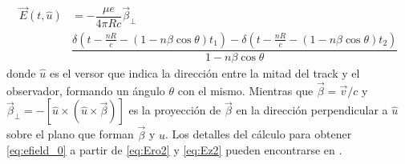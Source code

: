 	\begin{equation}
	\renewcommand{\arraystretch}{2.5}
	\begin{array}{rl}
		\vec{E}(t,\hat{u})
		&=
		-\dfrac{\mu e}{4\pi Rc}
		\vec\beta_{\bot}\\
		& 
		\dfrac{\delta(t-\frac{nR}{c}-(1-n\beta\cos\theta)t_1)
			-\delta(t-\frac{nR}{c}-(1-n\beta\cos\theta)t_2)}{1-n\beta\cos\theta}
	\end{array}
	\label{eq:efield_0}
	\end{equation}
	donde $\hat{u}$ es el versor que indica la direcci\'on entre la mitad del track y el observador, formando un \'angulo $\theta$ con el mismo. Mientras que $\vec\beta=\vec v/c$ y $\vec\beta_{\bot}=-[\hat{u}\times(\hat{u}\times\vec\beta)]$ es la proyecci\'on de $\vec\beta$ en la direcci\'on perpendicular a $\hat u$ sobre el plano que forman $\vec\beta$ y $\hat u$.
	Los detalles del c\'alculo para obtener \ref{eq:efield_0} a partir de \ref{eq:Ero2} y \ref{eq:Ez2} pueden encontrarse en \cite{alvarez:2013}.
	
